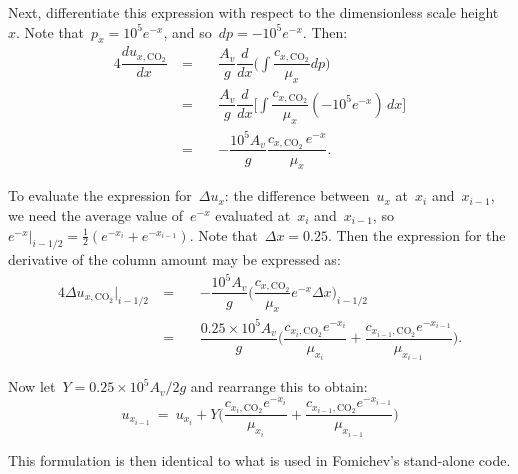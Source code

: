    Next, differentiate this expression with respect to the dimensionless scale height~$x$. Note that~${p_x = 10^5 e^{-x}}$, and so~${dp = -10^5 e^{-x}}$. Then:
%
   \begin{alignat}{4}
   \dfrac{d u_{x, \text{CO}_2}}{dx}\ & =\ && \dfrac{A_v}{g} \dfrac{d}{dx} \bigg( \int \dfrac{c_{x, \text{CO}_2}}{\mu_x} dp \bigg) \nonumber \\
                                     & =\ && \dfrac{A_v}{g} \dfrac{d}{dx} \bigg[ \int \dfrac{c_{x, \text{CO}_2}}{\mu_x} (- 10^5 e^{-x})\, dx \bigg] \nonumber \\
                                     & =\ && - \dfrac{10^5 A_v}{g} \dfrac{c_{x, \text{CO}_2}\, e^{-x}}{\mu_x}.
   \end{alignat}


   To evaluate the expression for~$\Delta u_x$: the difference between~$u_x$ at~$x_i$ and~$x_{i - 1}$, we need the average value of~$e^{-x}$ evaluated at~$x_i$ and~$x_{i - 1}$, so $e^{-x}|_{i - 1/2} = \frac{1}{2} (e^{-x_i} + e^{-x_{i - 1}})$. Note that~$\Delta x = 0.25$. Then the expression for the derivative of the column amount may be expressed as:
   \begin{alignat}{4}
   \Delta u_{x, \text{CO}_2}|_{i - 1/2}\ & =\ && - \dfrac{10^5 A_v}{g} \bigg( \dfrac{c_{x,\text{CO}_2}}{\mu_x} e^{-x} \Delta x \bigg)_{i - 1/2} \nonumber \\
                                         & =\ && \dfrac{0.25 \times 10^5 A_v}{g} \bigg( \dfrac{c_{x_i, \text{CO}_2} e^{-x_i}}{\mu_{x_i}} + \dfrac{c_{x_{i - 1}, \text{CO}_2} e^{-x_{i - 1}}}{\mu_{x_{i-1}}} \bigg). \nonumber
   \end{alignat}

   \noindent Now let~$Y = 0.25 \times 10^5 A_v / 2g $ and rearrange this to obtain:
%
   \begin{equation}
   u_{x_{i - 1}}\ =\ u_{x_{i}} + Y \bigg( \dfrac{c_{x_i, \text{CO}_2} e^{-x_i}}{\mu_{x_i}} + \dfrac{c_{x_{i - 1}, \text{CO}_2} e^{-x_{i - 1}}}{\mu_{x_{i-1}}} \bigg) \nonumber
   \end{equation}

   This formulation is then identical to what is used in Fomichev's stand-alone code.


